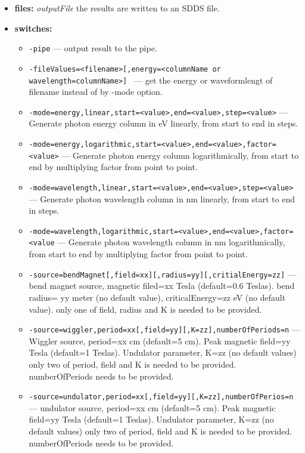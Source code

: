 \begin{itemize}
\item {\bf files:}
{\em outputFile} the results are written to an SDDS file.
\item {\bf switches:}
    \begin{itemize}
    \item {\tt -pipe} --- output result to the pipe.
    \item {\tt -fileValues=<filename>[,energy=<columnName or wavelength=columnName>] } --- get the energy or waveformlengt of filename instead of by -mode option.
    \item {\tt -mode=energy,linear,start=<value>,end=<value>,step=<value>} --- Generate photon energy column in eV linearly, from start to end in steps.
    \item {\tt -mode=energy,logarithmic,start=<value>,end=<value>,factor=<value>} --- Generate photon energy column logarithmically, from start to end by multiplying
                   factor from point to point.
    \item {\tt -mode=wavelength,linear,start=<value>,end=<value>,step=<value>} --- Generate photon wavelength column in nm linearly, from start to end in steps.
    \item {\tt -mode=wavelength,logarithmic,start=<value>,end=<value>,factor=<value} ---
        Generate photon wavelength column in nm logarithmically, from start 
        to end by multiplying factor from point to point.
    \item {\tt -source=bendMagnet[,field=xx][,radius=yy][,critialEnergy=zz]} --- bend 
        magnet source, magnetic filed=xx Tesla (default=0.6 Teslas). 
        bend radius= yy meter (no default value), criticalEnergy=zz eV 
        (no default value). only one of field, radius and K is needed to be provided. 
    \item {\tt -source=wiggler,period=xx[,field=yy][,K=zz],numberOfPeriods=n} ---
        Wiggler source, period=xx cm (default=5 cm).  
        Peak magnetic field=yy Tesla (default=1 Teslas). 
        Undulator parameter, K=zz (no default values) 
        only two of period, field and K is needed to be provided.  
        numberOfPeriods needs to be provided.  
    \item {\tt -source=undulator,period=xx[,field=yy][,K=zz],numberOfPerios=n} ---
        undulator source, period=xx cm (default=5 cm). 
        Peak magnetic field=yy Tesla (default=1 Teslas).
        Undulator parameter, K=zz (no default values) 
        only two of period, field and K is needed to be provided.
        numberOfPeriods needs to be provided. 

\end{itemize}
\end{itemize}

